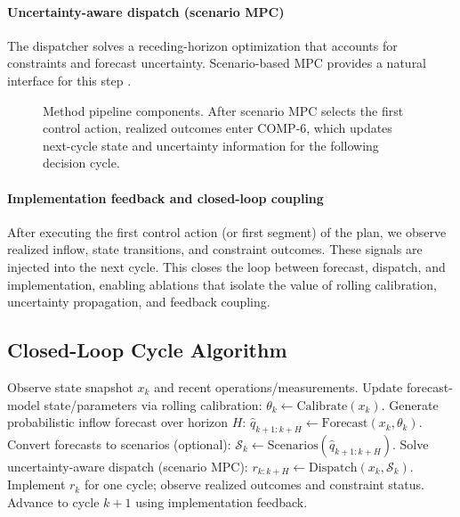 \documentclass[conference]{IEEEtran}
\begin{document}
\paragraph{Uncertainty-aware dispatch (scenario MPC)}
The dispatcher solves a receding-horizon optimization that accounts for constraints and forecast
uncertainty. Scenario-based MPC provides a natural interface for this step
\cite{cestari2023scenario,mayne2000constrained,raso2017combining}.

\begin{figure}[t]
\centering
\resizebox{\columnwidth}{!}{}
\caption{Method pipeline components. After scenario MPC selects the first control action, realized outcomes enter COMP-6, which updates next-cycle state and uncertainty information for the following decision cycle.}
\label{fig:pipeline}
\end{figure}

\paragraph{Implementation feedback and closed-loop coupling}
After executing the first control action (or first segment) of the plan, we observe realized
inflow, state transitions, and constraint outcomes. These signals are injected into the next
cycle. This closes the loop between forecast, dispatch, and implementation, enabling ablations
that isolate the value of rolling calibration, uncertainty propagation, and feedback coupling.

\subsection{Closed-Loop Cycle Algorithm}
\begin{algorithm}[t]
\caption{Closed-loop forecast--dispatch--implementation coupling (per cycle $k$).}
\begin{algorithmic}[1]
\STATE Observe state snapshot $x_k$ and recent operations/measurements.
\STATE Update forecast-model state/parameters via rolling calibration: $\theta_k \leftarrow \mathrm{Calibrate}(x_k)$.
\STATE Generate probabilistic inflow forecast over horizon $H$: $\hat{q}_{k+1:k+H} \leftarrow \mathrm{Forecast}(x_k,\theta_k)$.
\STATE Convert forecasts to scenarios (optional): $\mathcal{S}_k \leftarrow \mathrm{Scenarios}(\hat{q}_{k+1:k+H})$.
\STATE Solve uncertainty-aware dispatch (scenario MPC): $r_{k:k+H} \leftarrow \mathrm{Dispatch}(x_k,\mathcal{S}_k)$.
\STATE Implement $r_k$ for one cycle; observe realized outcomes and constraint status.
\STATE Advance to cycle $k{+}1$ using implementation feedback.
\end{algorithmic}
\end{algorithm}
\end{document}
